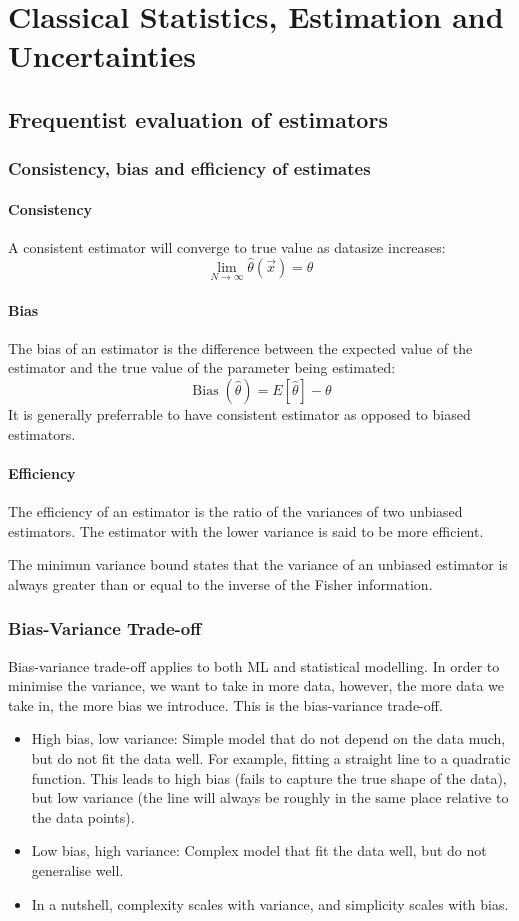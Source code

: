 \documentclass[12pt,a4paper]{article}
\begin{document}
\section{Classical Statistics, Estimation and Uncertainties}
\subsection{Frequentist evaluation of estimators}
\subsubsection{Consistency, bias and efficiency of estimates}
\paragraph{Consistency}
    A consistent estimator will converge to true value as datasize increases:
    $$
    \lim _{N \rightarrow \infty} \hat{\theta}(\vec{x})=\theta
    $$
\paragraph{Bias}
    The bias of an estimator is the difference between the expected value of the estimator and the true value of the parameter being estimated:
    $$
    \operatorname{Bias}(\hat{\theta})=E[\hat{\theta}]-\theta
    $$
    It is generally preferrable to have consistent estimator as opposed to biased estimators.
\paragraph{Efficiency}
    The efficiency of an estimator is the ratio of the variances of two unbiased estimators. The estimator with the lower variance is said to be more efficient.

    The minimun variance bound states that the variance of an unbiased estimator is always greater than or equal to the inverse of the Fisher information.
    
\subsubsection{Bias-Variance Trade-off}
    Bias-variance trade-off applies to both ML and statistical modelling.
    In order to minimise the variance, we want to take in more data, however, the more data we take in, the more bias we introduce. This is the bias-variance trade-off.
    \begin{itemize}
        \item High bias, low variance: Simple model that do not depend on the data much, but do not fit the data well. For example, fitting a straight line to a quadratic function. This leads to high bias (fails to capture the true shape of the data), but low variance (the line will always be roughly in the same place relative to the data points).
        \item Low bias, high variance: Complex model that fit the data well, but do not generalise well.
        \item In a nutshell, complexity scales with variance, and simplicity scales with bias.
    \end{itemize}
\end{document}

